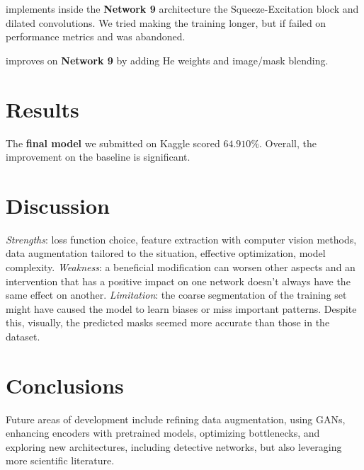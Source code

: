 \documentclass[11pt]{template}
\begin{document}
\begin{multicols}{2}
\begin{description}[leftmargin=!]
  \item[\textbf{Network 10}] implements inside the \textbf{Network 9} architecture the Squeeze-Excitation block and dilated convolutions. We tried making the training longer, but if failed on performance metrics and was abandoned.
  
  \item[\textbf{Final Model}] improves on \textbf{Network 9} by adding He weights and image/mask blending.
\end{description}

\section{Results}
The \textbf{final model} we submitted on Kaggle scored $64.910\%$. Overall, the improvement on the baseline is significant.
\section{Discussion}
\textit{Strengths}: loss function choice, feature extraction with computer vision methods, data augmentation tailored to the situation, effective optimization, model complexity. 
\textit{Weakness}: a beneficial modification can worsen other aspects and an intervention that has a positive impact on one network doesn’t always have the same effect on another. 
\textit{Limitation}: the coarse segmentation of the training set might have caused the model to learn biases or miss important patterns. Despite this, visually, the predicted masks seemed more accurate than those in the dataset.

\section{Conclusions}
Future areas of development include refining data augmentation, using GANs, enhancing encoders with pretrained models, optimizing bottlenecks, and exploring new architectures, including detective networks, but also leveraging more scientific literature.
\nocite{*}



\end{multicols}
\end{document}
